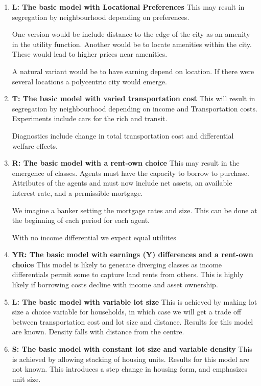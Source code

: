 \begin{enumerate}

\item \textbf{L: The basic model with Locational Preferences}
This may result in segregation by neighbourhood depending on preferences.

One version would be include distance to the edge of the city as an amenity in the utility function. Another would be to locate amenities within the city. These would lead to higher prices near amenities.

A natural variant would be to have earning depend on location. If there were several locations  a polycentric city would emerge.

\item \textbf{T: The basic model with varied transportation cost }
This will result in segregation by neighbourhood depending on income and Transportation costs. Experiments include cars for the rich and  transit. 

Diagnostics include change in total transportation cost and differential welfare effects.

\item \textbf{R: The basic model with a rent-own choice}
This may result in the emergence of classes. Agents must have the capacity to borrow to purchase. Attributes of the agents and must now include  net assets,  an available interest rate, and a permissible mortgage.

We imagine a banker setting the mortgage rates and size. This can be done at the beginning of each period for each agent. 

With no income differential we expect equal utiliites

\item \textbf{YR: The basic model with earnings (Y) differences and a rent-own choice}
This model is likely to generate diverging classes as income differentials permit some to capture land rents from others. This is highly likely if borrowing costs decline with income and asset ownership.

\item \textbf{L: The basic model with variable lot size}
This is achieved by making lot size a choice variable for households, in which case we will get a trade off between transportation cost and lot size and distance. Results for this model are known. Density  falls with distance from the centre. 

\item \textbf{S: The basic model with constant lot size and variable density}
This is achieved by allowing stacking of housing units. Results for this model are not known. This introduces a step change in housing form, and emphasizes unit size.
\end{enumerate}


